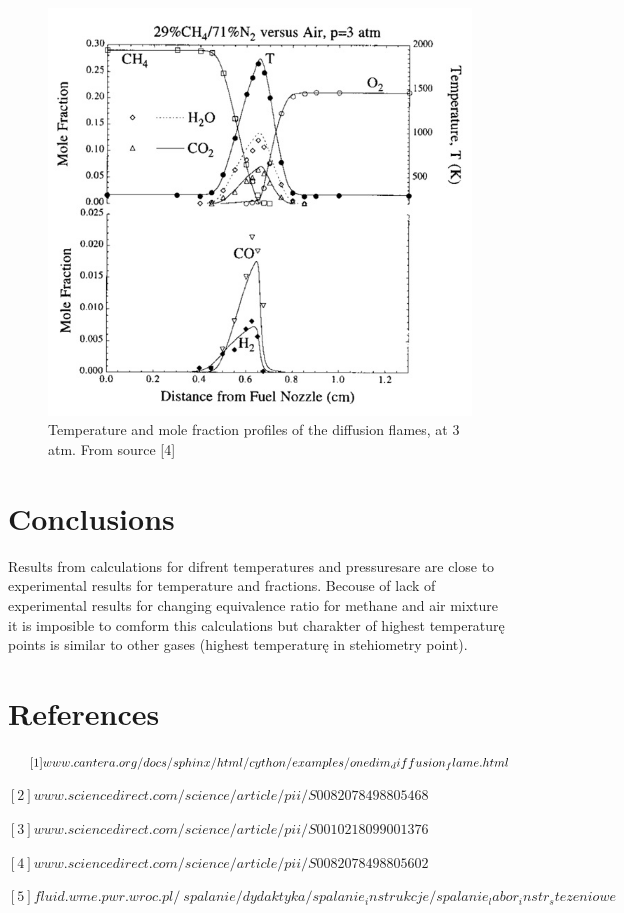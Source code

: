 \documentclass[a4paper]{article}
\newcommand{\sepspace}{\vspace*{1em}}
\begin{document}
\begin{figure}
\includegraphics[width=1\textwidth]{5.jpg}
\caption{\label{fig:5}Temperature and mole fraction profiles of the diffusion flames, at 3 atm. From source [4]}
\end{figure}
\section{Conclusions}
Results from calculations for difrent temperatures and pressuresare are close to experimental results for temperature and fractions. Becouse of lack of experimental results for changing equivalence ratio for methane and air mixture it is imposible to comform this calculations but charakter of highest temperaturę points is similar to other gases (highest temperaturę in stehiometry point).
 
\sepspace

\sepspace

\sepspace

\section{References}

$
\hspace{5,35mm}[1] www.cantera.org/docs/sphinx/html/cython/examples/onedim_diffusion_flame.html
$

$
[2] www.sciencedirect.com/science/article/pii/S0082078498805468
$

$
[3] www.sciencedirect.com/science/article/pii/S0010218099001376
$

$
[4] www.sciencedirect.com/science/article/pii/S0082078498805602
$

$
[5] fluid.wme.pwr.wroc.pl/~spalanie/dydaktyka/spalanie_instrukcje/spalanie_labor_instr_stezeniowe
$
\end{document}
